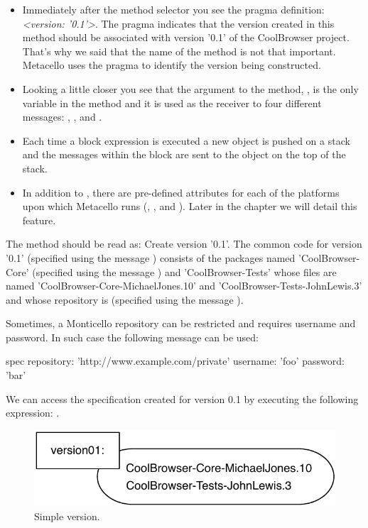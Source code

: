 \documentclass[a4paper,10pt,twoside]{book}
\begin{document}
\begin{itemize}
\item Immediately after the method selector you see the pragma definition:  {\em <version: '0.1'>}. The pragma indicates that the version created in this method should be associated with version '0.1' of the CoolBrowser project. That's why we said that the name of the method is not that important. Metacello uses the pragma to identify the version being constructed.

\item Looking a little closer you see that the argument to the method, , is the only variable in
the method and it is used as the receiver to four different messages:   ,   ,    and  .

\item Each time a block expression is executed a new object is pushed on a stack and the messages within the block are sent to the object on the top of the stack.

\item In addition to , there are pre-defined attributes for each of the platforms upon which Metacello runs (, ,  and ). Later in the chapter we will detail this feature. 
\end{itemize}


The  method  should be read as: Create version '0.1'. The common code for version '0.1' (specified using the message ) consists of the packages named 'CoolBrowser-Core' (specified using the message ) and 'CoolBrowser-Tests'  whose files are named 'CoolBrowser-Core-MichaelJones.10' and 'CoolBrowser-Tests-JohnLewis.3' and whose repository is  (specified using the message ).

Sometimes, a Monticello repository can be restricted and requires username and password. In such case the following message can be used:

\begin{code}{}
       spec repository: 'http://www.example.com/private' username: 'foo' password: 'bar' 
\end{code}

We can access the specification created for version 0.1 by executing the following expression: . 

\begin{figure}
\begin{center}
\includegraphics[width=0.6\linewidth]{version01}
\caption{Simple version.}
\end{center}
\end{figure}
\end{document}
